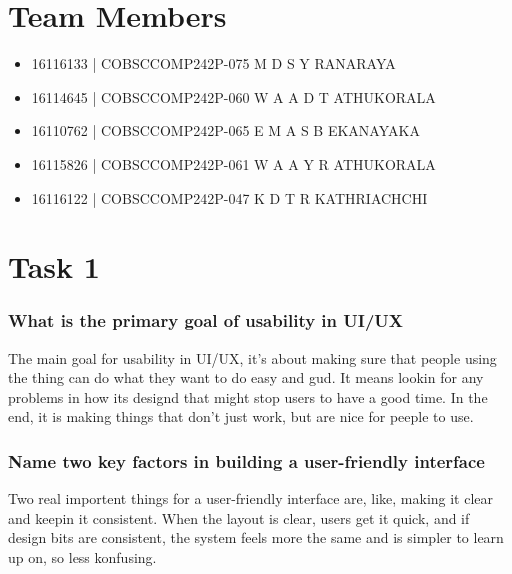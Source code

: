 \documentclass[12pt,a4paper]{article}
\begin{document}
\newpage
{} %

\section*{\centering Team Members}
\vspace{1cm}
\begin{itemize}
    \item 16116133 | COBSCCOMP242P-075 \quad M D S Y RANARAYA
    \item 16114645 | COBSCCOMP242P-060 \quad W A A D T ATHUKORALA
    \item 16110762 | COBSCCOMP242P-065 \quad E M A S B EKANAYAKA
    \item 16115826 | COBSCCOMP242P-061 \quad W A A Y R ATHUKORALA
    \item 16116122 | COBSCCOMP242P-047 \quad K D T R KATHRIACHCHI
\end{itemize}

\vspace{\fill} %

\newpage


\section*{Task 1}

\subsubsection*{What is the primary goal of usability in UI/UX}
The main goal for usability in UI/UX, it's about making sure that people using the thing can do what they want to do easy and gud. It means lookin for any problems in how its designd that might stop users to have a good time. In the end, it is making things that don't just work, but are nice for peeple to use.

\subsubsection*{Name two key factors in building a user-friendly interface}
Two real importent things for a user-friendly interface are, like, making it clear and keepin it consistent. When the layout is clear, users get it quick, and if design bits are consistent, the system feels more the same and is simpler to learn up on, so less konfusing.
\end{document}
